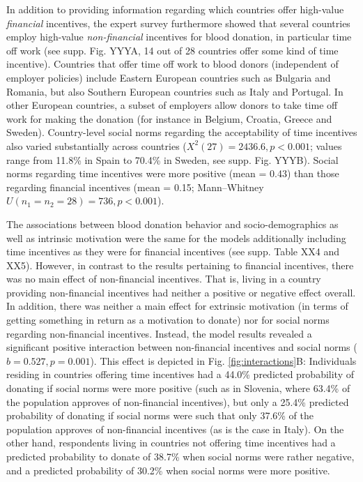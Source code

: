 \documentclass[AER]{AEA}
\begin{document}
In addition to providing information regarding which countries offer high-value \textit{financial} incentives, the expert survey furthermore showed that several countries employ high-value \textit{non-financial} incentives for blood donation, in particular time off work (see supp. Fig. YYYA, 14 out of 28 countries offer some kind of time incentive). Countries that offer time off work to blood donors (independent of employer policies) include Eastern European countries such as Bulgaria and Romania, but also Southern European countries such as Italy and Portugal. In other European countries, a subset of employers allow donors to take time off work for making the donation (for instance in Belgium, Croatia, Greece and Sweden). Country-level social norms regarding the acceptability of time incentives also varied substantially across countries (${X}^2(27) = 2436.6, p < 0.001$; values range from 11.8\% in Spain to 70.4\% in Sweden, see supp. Fig. YYYB). Social norms regarding time incentives were more positive (mean = 0.43) than those regarding financial incentives (mean = 0.15; Mann–Whitney $U(n_{1} = n_{2} = 28) = 736, p < 0.001$).

The associations between blood donation behavior and socio-demographics as well as intrinsic motivation were the same for the models additionally including time incentives as they were for financial incentives (see supp. Table XX4 and XX5). However, in contrast to the results pertaining to financial incentives, there was no main effect of non-financial incentives. That is, living in a country providing non-financial incentives had neither a positive or negative effect overall. In addition, there was neither a main effect for extrinsic motivation (in terms of getting something in return as a motivation to donate) nor for social norms regarding non-financial incentives. Instead, the model results revealed a significant positive interaction between non-financial incentives and social norms ($b = 0.527, p = 0.001$). This effect is depicted in Fig. \ref{fig:interactions}B: Individuals residing in countries offering time incentives had a 44.0\% predicted probability of donating if social norms were more positive (such as in Slovenia, where 63.4\% of the population approves of non-financial incentives), but only a 25.4\% predicted probability of donating if social norms were such that only 37.6\% of the population approves of non-financial incentives (as is the case in Italy). On the other hand, respondents living in countries not offering time incentives had a predicted probability to donate of 38.7\% when social norms were rather negative, and a predicted probability of 30.2\% when social norms were more positive.
\end{document}
